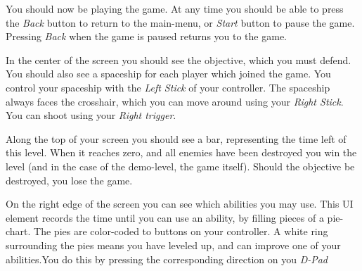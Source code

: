 You should now be playing the game. At any time you should be able to press
the \emph{Back} button to return to the main-menu, or \emph{Start} button to
pause the game. Pressing \emph{Back} when the game is paused returns you to
the game.

In the center of the screen you should see the objective, which you must 
defend. You should also see a spaceship for each player which joined the game.
You control your spaceship with the \emph{Left Stick} of your controller.
The spaceship always faces the crosshair, which you can move around using
your \emph{Right Stick}. You can shoot using your \emph{Right trigger}.

Along the top of your screen you should see a bar, representing the time
left of this level. When it reaches zero, and all enemies have been destroyed
you win the level (and in the case of the demo-level, the game itself).
Should the objective be destroyed, you lose the game.

On the right edge of the screen you can see which abilities you may use.
This UI element records the time until you can use an ability, by filling
pieces of a pie-chart. The pies are color-coded to buttons on your controller.
A white ring surrounding the pies means you have leveled up, and can improve
one of your abilities.You do this by pressing the corresponding direction
on you \emph{D-Pad}